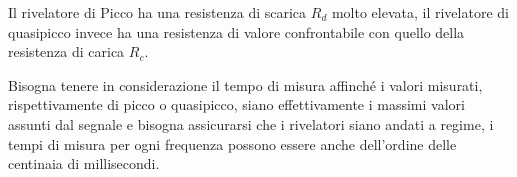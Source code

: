 Il rivelatore di Picco ha una resistenza di scarica $R_d$ molto elevata,
il rivelatore di quasipicco invece ha una resistenza di valore confrontabile
con quello della resistenza di carica $R_c$.

Bisogna tenere in considerazione il tempo di misura affinché i valori
misurati, rispettivamente di picco o quasipicco, siano
effettivamente i massimi valori assunti dal segnale e bisogna assicurarsi che
i rivelatori siano andati a regime, i tempi di misura per ogni frequenza possono
essere anche dell'ordine delle centinaia di millisecondi.
